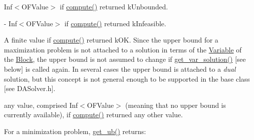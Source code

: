 \begin{DoxyItemize}
\item Inf$<$\+O\+F\+Value$>$ if \mbox{\hyperlink{class_s_m_spp__di__unipi__it_1_1_m_c_f_solver_afc8ff54ab05d22f4cca0fb0bfbeb7a49}{compute()}} returned k\+Unbounded.
\item -\/ Inf$<$\+O\+F\+Value$>$ if \mbox{\hyperlink{class_s_m_spp__di__unipi__it_1_1_m_c_f_solver_afc8ff54ab05d22f4cca0fb0bfbeb7a49}{compute()}} returned k\+Infeasible.
\item A finite value if \mbox{\hyperlink{class_s_m_spp__di__unipi__it_1_1_m_c_f_solver_afc8ff54ab05d22f4cca0fb0bfbeb7a49}{compute()}} returned k\+OK. Since the upper bound for a maximization problem is not attached to a solution in terms of the \mbox{\hyperlink{class_s_m_spp__di__unipi__it_1_1_variable}{Variable}} of the \mbox{\hyperlink{class_s_m_spp__di__unipi__it_1_1_block}{Block}}, the upper bound is not assumed to change if \mbox{\hyperlink{class_s_m_spp__di__unipi__it_1_1_m_c_f_solver_ac83fa9679882440d13fb5940494699c5}{get\+\_\+var\+\_\+solution()}} \mbox{[}see below\mbox{]} is called again. In several cases the upper bound is attached to a {\itshape dual} solution, but this concept is not general enough to be supported in the base class \mbox{[}see D\+A\+Solver.\+h\mbox{]}.
\item any value, comprised Inf$<$\+O\+F\+Value$>$ (meaning that no upper bound is currently available), if \mbox{\hyperlink{class_s_m_spp__di__unipi__it_1_1_m_c_f_solver_afc8ff54ab05d22f4cca0fb0bfbeb7a49}{compute()}} returned any other value.
\end{DoxyItemize}

For a minimization problem, \mbox{\hyperlink{class_s_m_spp__di__unipi__it_1_1_m_c_f_solver_a106686dbd21fcdd86e42130d39a7ec2f}{get\+\_\+ub()}} returns\+:


